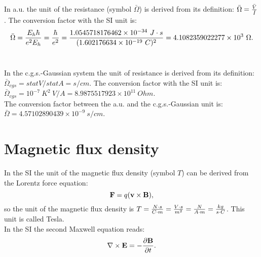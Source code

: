 \documentclass[12pt,a4paper]{article}
\def\hbarf{1.0545718176462\times 10^{-34}}
\def\barc{1.602176634\times 10^{-19}}
\def\barohm{4.1082359022277\times 10^{3}}
\def\ohmtoohm{8.9875517923\times 10^{11}}
\def\barohmcgs{4.57102890439\times 10^{-9}}
\begin{document}
{\color{web-blue} In a.u. the unit of the resistance (symbol $\bar \Omega$) 
is derived from its definition: $\bar \Omega={\bar V \over \bar I}$. The
conversion factor with the SI unit is:
\begin{equation}
\bar \Omega = {E_h \hbar \over e^2 E_h}=  
{\hbar \over e^2}=
{\hbarf\ J\cdot s\over (\barc\ C)^2}=\barohm\ \Omega.
\end{equation}
\\
}

{\color{orange} In the c.g.s.-Gaussian system the unit of resistance
is derived from its definition:
$\bar \Omega_{cgs}=statV/statA=s/cm$. The conversion factor with the SI 
unit is:
$\bar \Omega_{cgs}=10^{-7}\ K^2\ V/A=\ohmtoohm\ Ohm$.
}
\\

{\color{green}
The conversion factor between the a.u. and the c.g.s.-Gaussian unit
is: $\bar \Omega = \barohmcgs \ s/cm$.
}


\newpage
\section{\color{coral}Magnetic flux density}
In the SI the unit of the magnetic flux density 
(symbol $T$) can be derived from the Lorentz force equation:
\begin{equation}
{\bf F}=q ({\bf v} \times {\bf B}),
\label{lforce}
\end{equation}
so the unit of the magnetic flux density is $T={N\cdot s\over C\cdot m} = 
{V \cdot s \over m^2}={N \over A\cdot m}={kg \over s \cdot C}$. 
This unit is called Tesla. \\
In the SI the second Maxwell equation reads:
\begin{equation}
\nabla \times {\bf E}=-{\partial {\bf B} \over \partial t}.
\end{equation}
\\
\end{document}
